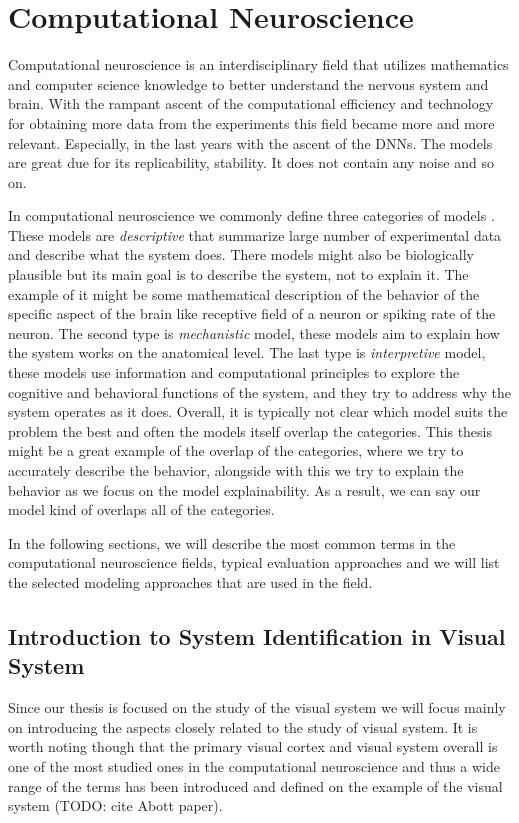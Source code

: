 \chapter{Computational Neuroscience}
\label{chap:computation_neuroscience}
Computational neuroscience is an interdisciplinary field that
utilizes mathematics and computer science knowledge to better
understand the nervous system and brain. With the rampant
ascent of the computational efficiency and technology for
obtaining more data from the experiments this field
became more and more relevant. Especially, in the last
years with the ascent of the DNNs. The models are great due for
its replicability, stability. It does not contain any noise and so on.

In computational neuroscience we commonly define three categories of models
\citet{dayan2005theoretical}. These models are \emph{descriptive} that summarize
large number of experimental data and describe what the system does. There models
might also be biologically plausible but its main goal is to describe the 
system, not to explain it. The example of it might be some mathematical description
of the behavior of the specific aspect of the brain like receptive field of a neuron 
or spiking rate of the neuron.
The second type is \emph{mechanistic} model, these 
models aim to explain how the system works on the anatomical level. The last
type is \emph{interpretive} model, these models use information and computational
principles to explore the cognitive and behavioral functions of the system, and they 
try to address why the system operates as it does. Overall,
it is typically not clear which model suits the problem the best and often the models
itself overlap the categories. This thesis might be a great example of the overlap of
the categories, where we try to accurately
describe the behavior, alongside with this we try to explain the behavior as we 
focus on the model explainability. As a result, we can say our model kind of overlaps
all of the categories.

In the following sections, we will describe the most common terms in the computational
neuroscience fields, typical evaluation approaches and we will list the selected 
modeling approaches that are used in the field.

\section{Introduction to System Identification in Visual System}
\label{sec:system_identification}
Since our thesis is focused on the study of the visual system we will focus mainly on
introducing the aspects closely related to the study of visual system. It is
worth noting though that the primary visual cortex and visual system overall is one of
the most studied ones in the computational neuroscience and thus a wide range of the
terms has been introduced and defined on the example of the visual system (TODO: cite
Abott paper). 

